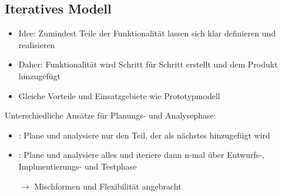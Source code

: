 \subsection{Iteratives Modell}
\begin{itemize}
    \item Idee: Zumindest Teile der Funktionalität lassen sich klar definieren und realisieren
    \item Daher: Funktionalität wird Schritt für Schritt erstellt und dem Produkt \glqq hinzugefügt\grqq
    \item Gleiche Vorteile und Einsatzgebiete wie Prototypmodell
\end{itemize}
Unterschiedliche Ansätze für Planungs- und Analysephase:
\begin{itemize}
    \item {}: Plane und analysiere nur den Teil, der als nächstes hinzugefügt wird
    \item {}: Plane und analysiere alles und iteriere dann n-mal über Entwurfs-, Implmentierungs- und Testphase
    \item[$\rightarrow$] Mischformen und Flexibilität angebracht
\end{itemize}


